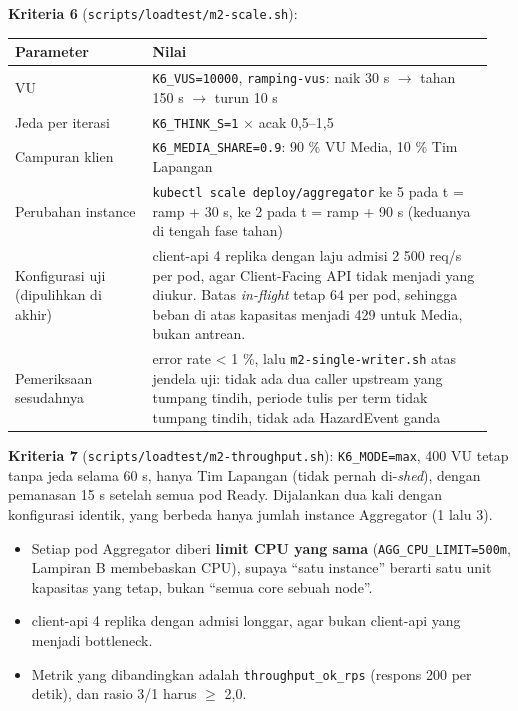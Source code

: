 \textbf{Kriteria 6} (\texttt{scripts/\allowbreak{}loadtest/\allowbreak{}m2-\allowbreak{}scale.\allowbreak{}sh}):


{\small
\begin{longtable}{@{}>{\raggedright\arraybackslash}p{0.271\linewidth}>{\raggedright\arraybackslash}p{0.675\linewidth}@{}}
\toprule
\textbf{Parameter} & \textbf{Nilai} \\
\midrule
\endhead
VU & \texttt{K6\_\allowbreak{}VUS=\allowbreak{}10000}, \texttt{ramping-\allowbreak{}vus}: naik 30 s $\rightarrow$ tahan 150 s $\rightarrow$ turun 10 s \\
Jeda per iterasi & \texttt{K6\_\allowbreak{}THINK\_\allowbreak{}S=\allowbreak{}1} $\times$ acak 0,5--1,5 \\
Campuran klien & \texttt{K6\_\allowbreak{}MEDIA\_\allowbreak{}SHARE=\allowbreak{}0.\allowbreak{}9}: 90 \% VU Media, 10 \% Tim Lapangan \\
Perubahan instance & \texttt{kubectl scale deploy/\allowbreak{}aggregator} ke 5 pada t = ramp + 30 s, ke 2 pada t = ramp + 90 s (keduanya di tengah fase tahan) \\
Konfigurasi uji (dipulihkan di akhir) & client-api 4 replika dengan laju admisi 2 500 req/s per pod, agar Client-Facing API tidak menjadi yang diukur. Batas \emph{in-flight} tetap 64 per pod, sehingga beban di atas kapasitas menjadi 429 untuk Media, bukan antrean. \\
Pemeriksaan sesudahnya & error rate < 1 \%, lalu \texttt{m2-\allowbreak{}single-\allowbreak{}writer.\allowbreak{}sh} atas jendela uji: tidak ada dua caller upstream yang tumpang tindih, periode tulis per term tidak tumpang tindih, tidak ada HazardEvent ganda \\
\bottomrule
\end{longtable}
}

\textbf{Kriteria 7} (\texttt{scripts/\allowbreak{}loadtest/\allowbreak{}m2-\allowbreak{}throughput.\allowbreak{}sh}): \texttt{K6\_\allowbreak{}MODE=\allowbreak{}max}, 400 VU tetap tanpa jeda selama 60 s, hanya Tim Lapangan (tidak pernah di-\emph{shed}), dengan pemanasan 15 s setelah semua pod Ready. Dijalankan dua kali dengan konfigurasi identik, yang berbeda hanya jumlah instance Aggregator (1 lalu 3).


\begin{itemize}
\item Setiap pod Aggregator diberi \textbf{limit CPU yang sama} (\texttt{AGG\_\allowbreak{}CPU\_\allowbreak{}LIMIT=\allowbreak{}500m}, Lampiran B membebaskan CPU), supaya ``satu instance'' berarti satu unit kapasitas yang tetap, bukan ``semua core sebuah node''.
\item client-api 4 replika dengan admisi longgar, agar bukan client-api yang menjadi bottleneck.
\item Metrik yang dibandingkan adalah \texttt{throughput\_\allowbreak{}ok\_\allowbreak{}rps} (respons 200 per detik), dan rasio 3/1 harus $\ge$ 2,0.
\end{itemize}

